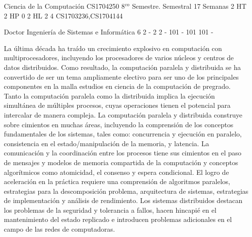 \documentclass[a4paper,8pt]{article}
\begin{document}
\setNombreProfesor{}
\setGradoProfesorAbreviado{}
\sylabusHeader

\academicaTable
{Ciencia de la Computación} %
{CS1704250} %
{8$^{vo}$ Semestre.} %
{Semestral} %
{17 Semanas} %
{2 HT} %
{2 HP} %
{0} %
{2 HL}  %
{2} %
{4} %
{CS1703236,CS1704144} %

\administrativaTable
{Doctor} %
{Ingeniería de Sistemas e Informática} %
{6} %
{2} %
{-} %
{2} %
{2} %
{-} %
{101} %
{-} %
{101} %
{101} %
{-} %


\begin{fundamentacion}
La última década ha traído un crecimiento explosivo en computación con multiprocesadores, incluyendo 
los procesadores de varios núcleos y centros de datos distribuidos. Como resultado, la computación 
paralela y distribuida se ha convertido de ser un tema ampliamente electivo para ser uno de los principales componentes
en la malla estudios en ciencia de la computación de pregrado. Tanto la computación paralela como la distribuida implica 
la ejecución simultánea de múltiples procesos, cuyas operaciones tienen el potencial para 
intercalar de manera compleja. La computación paralela y distribuida construye sobre cimientos en muchas 
áreas, incluyendo la comprensión de los conceptos fundamentales de los sistemas, tales como: concurrencia 
y ejecución en paralelo, consistencia en el estado/manipulación de la memoria, y latencia. La 
comunicación y la coordinación entre los procesos tiene sus cimientos en el paso de mensajes y modelos de 
memoria compartida de la computación y conceptos algorítmicos como atomicidad, el consenso y espera condicional. 
El logro de aceleración en la práctica requiere una comprensión de algoritmos paralelos, estrategias para la 
descomposición problema, arquitectura de sistemas, estrategias de implementación y análisis de 
rendimiento. Los sistemas distribuidos destacan los problemas de la seguridad y tolerancia a 
fallos, hacen hincapié en el mantenimiento del estado replicado e introducen problemas adicionales en el campo de 
las redes de computadoras.

\end{fundamentacion}
\end{document}
